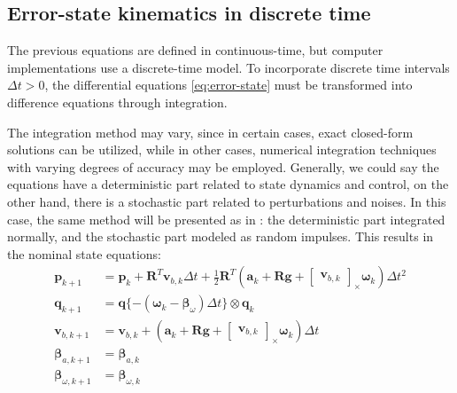\subsection{Error-state kinematics in discrete time}

The previous equations are defined in continuous-time, but computer implementations use a discrete-time model. To incorporate discrete time intervals $\Delta t>0$, the differential equations \eqref{eq:error-state} must be transformed into difference equations through integration. 

The integration method may vary, since in certain cases, exact closed-form solutions can be utilized, while in other cases, numerical integration techniques with varying degrees of accuracy may be employed. Generally, we could say the equations have a deterministic part related to state dynamics and control, on the other hand, there is a stochastic part related to perturbations and noises. In this case, the same method will be presented as in \cite{quaternion-eskf}: the deterministic part integrated normally, and the stochastic part modeled as random impulses. This results in the nominal state equations:
\begin{subequations}
\begin{align}
    \mathbf{p}_{k+1}&=\mathbf{p}_{k}+\mathbf{R}^T\mathbf{v}_{b,k}\Delta t + 
    \frac{1}{2}\mathbf{R}^T\left(\mathbf{a}_k+\mathbf{R}\mathbf{g} + \begin{bmatrix}\mathbf{v}_{b,k}\end{bmatrix}_{\times}\boldsymbol{\omega}_k\right)\Delta t^2   \\
    \mathbf{q}_{k+1}&=\mathbf{q}\{-(\boldsymbol{\omega}_k-\boldsymbol{\beta}_\omega)\Delta t\} \otimes \mathbf{q}_{k} \\
    \mathbf{v}_{b,k+1}&=\mathbf{v}_{b,k}+\left(\mathbf{a}_k+\mathbf{R}\mathbf{g} +\begin{bmatrix}\mathbf{v}_{b,k}\end{bmatrix}_{\times}\boldsymbol{\omega}_k\right)\Delta t \\
    \boldsymbol{\beta}_{a,k+1}&=\boldsymbol{\beta}_{a,k} \\
    \boldsymbol{\beta}_{\omega, k+1}&=\boldsymbol{\beta}_{\omega,k}
\end{align}
\label{eq:nom-eq-discrete}
\end{subequations}

